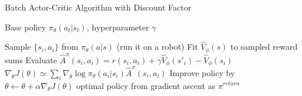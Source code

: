 \begin{algorithm}[t!]
\caption{Batch Actor-Critic Algorithm with Discount Factor}
\begin{algorithmic}[1]
\label{alg:batchacwdf}
\REQUIRE Base policy $\pi_\theta(a_t|s_t)$, hyperparameter $\gamma$

    \STATE Sample $\{s_i,a_i\}$ from $\pi_\theta(a|s)$ (run it on a robot)
    \STATE Fit $\hat{V}_\phi(s)$ to sampled reward sums
    \STATE Evaluate $\hat{A}^\pi(s_i,a_i) = r(s_i,a_i)+\gamma\hat{V}_\phi(s'_i)-\hat{V}_\phi(s_i)$
    \STATE $\nabla_\theta J(\theta) \simeq \sum_i\nabla_\theta\log \pi_\theta(a_i|s_i)\hat{A}^\pi(s_i,a_i)$
    \STATE Improve policy by $\theta \leftarrow \theta + \alpha\nabla_\theta J(\theta)$
\ENDWHILE
\RETURN optimal policy from gradient ascent as $\pi^{return}$
\end{algorithmic}
\end{algorithm}